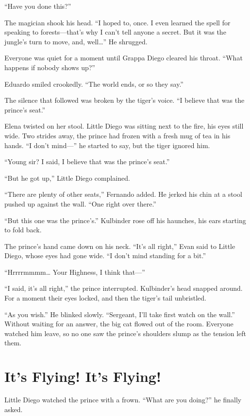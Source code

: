 \documentclass[10pt]{book}
\begin{document}
``Have you done this?''

The magician shook his head.  ``I hoped to, once.  I even learned the spell for speaking to forests---that's why I can't tell anyone a secret.  But it was the jungle's turn to move, and, well{\ldots}''  He shrugged.

Everyone was quiet for a moment until Grappa Diego cleared his throat. ``What happens if nobody shows up?''

Eduardo smiled crookedly.  ``The world ends, or so they say.''

The silence that followed was broken by the tiger's voice. ``I believe that was the prince's seat.''

Elena twisted on her stool. Little Diego was sitting next to the fire, his eyes still wide. Two strides away, the prince had frozen with a fresh mug of tea in his hands. ``I don't mind---'' he started to say, but the tiger ignored him.

``Young sir? I said, I believe that was the prince's seat.''

``But he got up,'' Little Diego complained.

``There are plenty of other seats,'' Fernando added. He jerked his chin at a stool pushed up against the wall. ``One right over there.''

``But this one was the prince's.'' Kulbinder rose off his haunches, his ears starting to fold back.

The prince's hand came down on his neck. ``It's all right,'' Evan said to Little Diego, whose eyes had gone wide. ``I don't mind standing for a bit.''

``Hrrrrmmmm{\ldots} Your Highness, I think that---''

``I said, it's all right,'' the prince interrupted. Kulbinder's head snapped around. For a moment their eyes locked, and then the tiger's tail unbristled.

``As you wish.'' He blinked slowly. ``Sergeant, I'll take first watch on the wall.'' Without waiting for an answer, the big cat flowed out of the room. Everyone watched him leave, so no one saw the prince's shoulders slump as the tension left them.

\chapter{It's Flying! It's Flying!}

Little Diego watched the prince with a frown. ``What are you doing?'' he finally asked.
\end{document}
